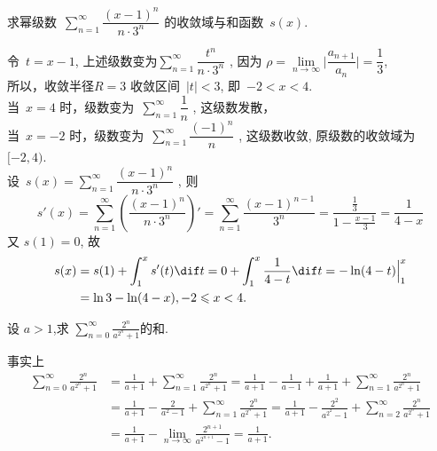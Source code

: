 \documentclass[color=green,titlestyle=hang]{elegantbook}%
\begin{document}
\begin{exercise}
求幂级数~$\sum\limits_{n=1}^\infty\dfrac{(x-1)^n}{n\cdot3^n} $ 的收敛域与和函数~$s(x)$.
\end{exercise}\begin{Solution}
令~$t = x-1$, 上述级数变为$\sum\limits_{n=1}^\infty\dfrac{t^n}{n\cdot3^n} $ ,
因为 $\rho = \lim\limits_{n\rightarrow\infty}\Big| \dfrac{a_{n+1}}{a_{n}}\Big| = \dfrac{1}{3}$, \\
所以，收敛半径$R=3 $ 收敛区间~$|t|<3$, 即~$-2<x<4$. \\
当~$x = 4$ 时，级数变为~$\sum\limits_{n=1}^\infty\dfrac{1}{n}$ , 这级数发散，\\
当~$x = -2$ 时，级数变为~$\sum\limits_{n=1}^\infty\dfrac{(-1)^n}{n}$ , 这级数收敛, 原级数的收敛域为~$[-2,4)$.  \\
设~$s(x) = \sum\limits_{n=1}^\infty\dfrac{(x-1)^n}{n\cdot3^n}$ , 则
\[s'(x) = \sum\limits_{n=1}^\infty\left(\dfrac{(x-1)^n}{n\cdot3^n}\right)' = \sum\limits_{n=1}^\infty\dfrac{(x-1)^{n-1}}{3^n} = \dfrac{\frac{1}{3}}{1-\frac{x-1}{3}}=\dfrac{1}{4-x}\]
又 $s(1) = 0$, 故
\begin{align*}
s(x) &= s(1)+\int_1^x s'(t)\dif t = 0 + \int_1^x\dfrac{1}{4-t}\dif t=-\ln(4-t)\Big|_1^x \\
&= \ln3-\ln(4-x),-2\leqslant x<4.
\end{align*}
\end{Solution}


\begin{exercise}设 $a>1$,求 $\sum\limits_{n = 0}^\infty {\frac{{{2^n}}}{{{a^{{2^n}}} + 1}}}$的和.
\end{exercise}\begin{solution}
事实上
\begin{align*}\sum\limits_{n = 0}^\infty {\frac{{{2^n}}}{{{a^{{2^n}}} + 1}}} &= \frac{1}{{a + 1}} + \sum\limits_{n = 1}^\infty {\frac{{{2^n}}}{{{a^{{2^n}}} + 1}}} = \frac{1}{{a + 1}} - \frac{1}{{a - 1}} + \frac{1}{{a + 1}} + \sum\limits_{n = 1}^\infty {\frac{{{2^n}}}{{{a^{{2^n}}} + 1}}} \\&= \frac{1}{{a + 1}} - \frac{2}{{{a^2} - 1}} + \sum\limits_{n = 1}^\infty {\frac{{{2^n}}}{{{a^{{2^n}}} + 1}}} = \frac{1}{{a + 1}} - \frac{{{2^2}}}{{{a^{{2^2}}} - 1}} + \sum\limits_{n = 2}^\infty {\frac{{{2^n}}}{{{a^{{2^n}}} + 1}}} \\&= \frac{1}{{a + 1}} - \mathop {\lim }\limits_{n \to \infty } \frac{{{2^{n + 1}}}}{{{a^{{2^{n + 1}}}} - 1}} = \frac{1}{{a + 1}}.\end{align*}
\end{solution}
\end{document}
